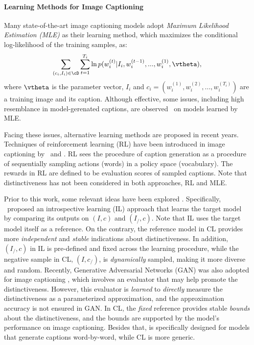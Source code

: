 \paragraph{Learning Methods for Image Captioning}
Many state-of-the-art image captioning models adopt \emph{Maximum Likelihood Estimation (MLE)} as their learning method,
which maximizes the conditional log-likelihood of the training samples, as:
\begin{align}
	\sum_{(c_i,I_i) \in \cD} \sum^{T_i}_{t = 1} \ln p(w^{(t)}_i|I_i, w^{(t - 1)}_i, ..., w^{(1)}_i, \vtheta),
\end{align}
where $\vtheta$ is the parameter vector, $I_i$ and $c_i = (w^{(1)}_i, w^{(2)}_i, ..., w^{(T_i)}_i)$ are a training image and its caption.
Although effective, some issues, including high resemblance in model-gerenated captions, are observed \cite{dai2017towards}~on models learned by MLE.

Facing these issues, alternative learning methods are proposed in recent years.
Techniques of reinforcement learning (RL) have been introduced in image captioning by \cite{rennie2016self}~and \cite{liu2016optimization}.
RL sees the procedure of caption generation as a procedure of sequentially sampling actions (words) in a policy space (vocabulary).
The rewards in RL are defined to be evaluation scores of sampled captions.
Note that distinctiveness has not been considered in both approaches, RL and MLE.

Prior to this work,
some relevant ideas have been explored \cite{vedantam2017context,mao2016generation,dai2017towards}.
Specifically, \cite{vedantam2017context,mao2016generation}~proposed an introspective learning (IL) approach
that learns the target model by comparing its outputs on $(I,c)$ and $(I_/,c)$.
Note that IL uses the target model itself as a reference.
On the contrary, the reference model in CL provides more \emph{independent} and \emph{stable} indications about distinctiveness.
In addition, $(I_/, c)$ in IL is pre-defined and fixed across the learning procedure,
while the negative sample in CL, \ie $(I,c_/)$, is \emph{dynamically} sampled, making it more diverse and random.
Recently, Generative Adversarial Networks (GAN) was also adopted for image captioning \cite{dai2017towards},
which involves an evaluator that may help promote the distinctiveness.
However, this evaluator is \emph{learned} to \emph{directly} measure the distinctiveness as a parameterized approximation,
and the approximation accuracy is not ensured in GAN.
In CL, the \emph{fixed} reference provides stable \emph{bounds} about the distinctiveness,
and the bounds are supported by the model's performance on image captioning.
Besides that, \cite{dai2017towards} is specifically designed for models that generate captions word-by-word,
while CL is more generic.
